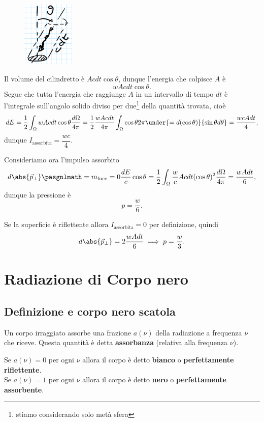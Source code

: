 \begin{figure}[!htb]
    \centering
    \includegraphics[width=2.5cm]{images/cilindretto_luce.png}
\end{figure}

\noindent
Il volume del cilindretto \`e $A cdt\cos \theta$, dunque l'energia che colpisce $A$ \`e
\[w Acdt\cos \theta.\]
Segue che tutta l'energia che raggiunge $A$ in un intervallo di tempo $dt$ \`e l'integrale sull'angolo solido diviso per due\footnote{stiamo considerando solo met\`a sfera} della quantit\`a trovata, cio\`e
\[dE=\frac12\int_\Omega w Acdt\cos\theta \frac{d\Omega}{4\pi}=\frac12\frac{w Acdt}{4\pi}\int_\Omega\cos\theta 2\pi \under{=d(\cos\theta)}{\sin\theta d\theta} =\frac{w cAdt}4,\]
dunque $I_{\text{assorbita}}=\dfrac{w c}4$.
\medskip

\noindent
Consideriamo ora l'impulso assorbito
\[d\abs{\vec p_\perp}\pasgnlmath={m_{\mathrm{luce}}=0}\frac{dE}c\cos\theta=\frac12\int_\Omega \frac w c Acdt(\cos\theta)^2 \frac{d\Omega}{4\pi}=\frac{w Adt}6,\]
dunque la pressione \`e
\[p=\frac w6.\]

\bigskip

\noindent
Se la superficie \`e riflettente allora $I_{\text{assorbita}}=0$ per definizione, quindi
\[d\abs{\vec p_\perp}=2\frac{w Adt}6\implies p=\frac w3.\]

\section{Radiazione di Corpo nero}
\subsection{Definizione e corpo nero scatola}
\begin{definition}[Assorbanza]
Un corpo irraggiato assorbe una frazione $a(\nu)$ della radiazione a frequenza $\nu$ che riceve. Questa quantit\`a \`e detta \textbf{assorbanza} (relativa alla frequenza $\nu$).
\end{definition}

\begin{definition}
Se $a(\nu)=0$ per ogni $\nu$ allora il corpo \`e detto \textbf{bianco} o \textbf{perfettamente riflettente}.\\
Se $a(\nu)=1$ per ogni $\nu$ allora il corpo \`e detto \textbf{nero} o \textbf{perfettamente assorbente}.
\end{definition}

